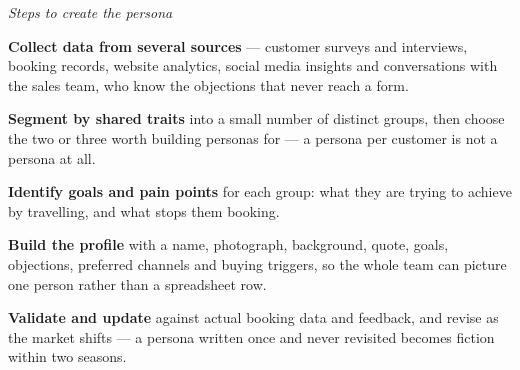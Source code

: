 \begin{qlist}
\textit{Steps to create the persona}
\begin{apts}
\item \textbf{Collect data from several sources} --- customer surveys and
      interviews, booking records, website analytics, social media insights and
      conversations with the sales team, who know the objections that never
      reach a form.
\item \textbf{Segment by shared traits} into a small number of distinct groups,
      then choose the two or three worth building personas for --- a persona per
      customer is not a persona at all.
\item \textbf{Identify goals and pain points} for each group: what they are
      trying to achieve by travelling, and what stops them booking.
\item \textbf{Build the profile} with a name, photograph, background, quote,
      goals, objections, preferred channels and buying triggers, so the whole
      team can picture one person rather than a spreadsheet row.
\item \textbf{Validate and update} against actual booking data and feedback, and
      revise as the market shifts --- a persona written once and never revisited
      becomes fiction within two seasons.
\end{apts}


\end{qlist}
